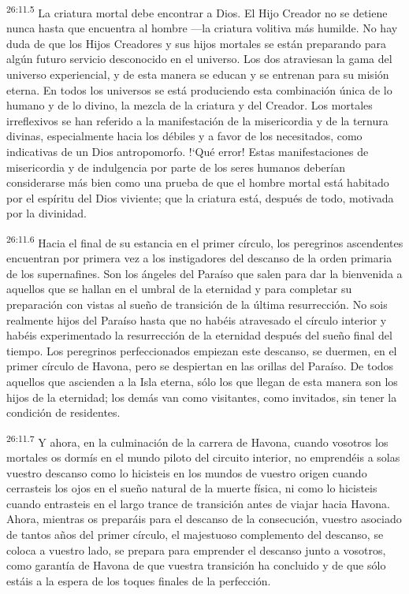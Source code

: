 \par
\textsuperscript{26:11.5} La criatura mortal debe encontrar a Dios. El Hijo Creador no se detiene nunca hasta que encuentra al hombre ---la criatura volitiva más humilde. No hay duda de que los Hijos Creadores y sus hijos mortales se están preparando para algún futuro servicio desconocido en el universo. Los dos atraviesan la gama del universo experiencial, y de esta manera se educan y se entrenan para su misión eterna. En todos los universos se está produciendo esta combinación única de lo humano y de lo divino, la mezcla de la criatura y del Creador. Los mortales irreflexivos se han referido a la manifestación de la misericordia y de la ternura divinas, especialmente hacia los débiles y a favor de los necesitados, como indicativas de un Dios antropomorfo. !`Qué error! Estas manifestaciones de misericordia y de indulgencia por parte de los seres humanos deberían considerarse más bien como una prueba de que el hombre mortal está habitado por el espíritu del Dios viviente; que la criatura está, después de todo, motivada por la divinidad.

\par
\textsuperscript{26:11.6} Hacia el final de su estancia en el primer círculo, los peregrinos ascendentes encuentran por primera vez a los instigadores del descanso de la orden primaria de los supernafines. Son los ángeles del Paraíso que salen para dar la bienvenida a aquellos que se hallan en el umbral de la eternidad y para completar su preparación con vistas al sueño de transición de la última resurrección. No sois realmente hijos del Paraíso hasta que no habéis atravesado el círculo interior y habéis experimentado la resurrección de la eternidad después del sueño final del tiempo. Los peregrinos perfeccionados empiezan este descanso, se duermen, en el primer círculo de Havona, pero se despiertan en las orillas del Paraíso. De todos aquellos que ascienden a la Isla eterna, sólo los que llegan de esta manera son los hijos de la eternidad; los demás van como visitantes, como invitados, sin tener la condición de residentes.

\par
\textsuperscript{26:11.7} Y ahora, en la culminación de la carrera de Havona, cuando vosotros los mortales os dormís en el mundo piloto del circuito interior, no emprendéis a solas vuestro descanso como lo hicisteis en los mundos de vuestro origen cuando cerrasteis los ojos en el sueño natural de la muerte física, ni como lo hicisteis cuando entrasteis en el largo trance de transición antes de viajar hacia Havona. Ahora, mientras os preparáis para el descanso de la consecución, vuestro asociado de tantos años del primer círculo, el majestuoso complemento del descanso, se coloca a vuestro lado, se prepara para emprender el descanso junto a vosotros, como garantía de Havona de que vuestra transición ha concluido y de que sólo estáis a la espera de los toques finales de la perfección.

